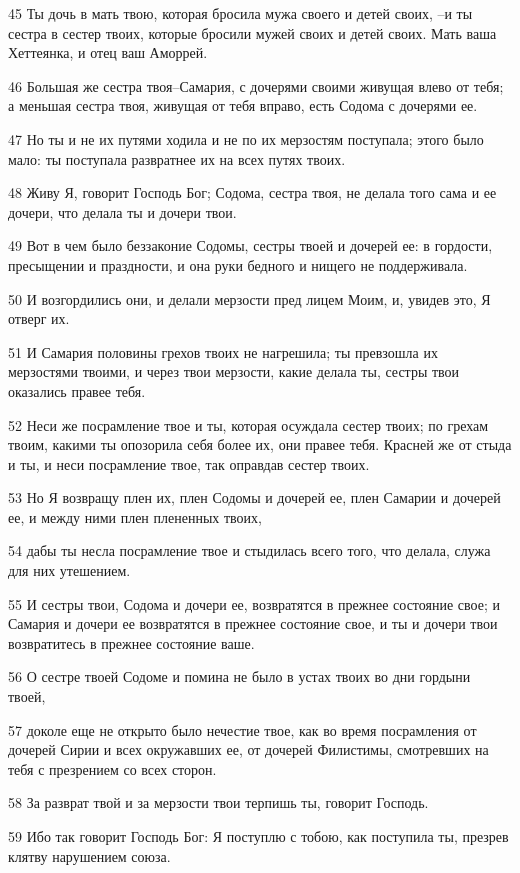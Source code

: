 \par 45 Ты дочь в мать твою, которая бросила мужа своего и детей своих, --и ты сестра в сестер твоих, которые бросили мужей своих и детей своих. Мать ваша Хеттеянка, и отец ваш Аморрей.
\par 46 Большая же сестра твоя--Самария, с дочерями своими живущая влево от тебя; а меньшая сестра твоя, живущая от тебя вправо, есть Содома с дочерями ее.
\par 47 Но ты и не их путями ходила и не по их мерзостям поступала; этого было мало: ты поступала развратнее их на всех путях твоих.
\par 48 Живу Я, говорит Господь Бог; Содома, сестра твоя, не делала того сама и ее дочери, что делала ты и дочери твои.
\par 49 Вот в чем было беззаконие Содомы, сестры твоей и дочерей ее: в гордости, пресыщении и праздности, и она руки бедного и нищего не поддерживала.
\par 50 И возгордились они, и делали мерзости пред лицем Моим, и, увидев это, Я отверг их.
\par 51 И Самария половины грехов твоих не нагрешила; ты превзошла их мерзостями твоими, и через твои мерзости, какие делала ты, сестры твои оказались правее тебя.
\par 52 Неси же посрамление твое и ты, которая осуждала сестер твоих; по грехам твоим, какими ты опозорила себя более их, они правее тебя. Красней же от стыда и ты, и неси посрамление твое, так оправдав сестер твоих.
\par 53 Но Я возвращу плен их, плен Содомы и дочерей ее, плен Самарии и дочерей ее, и между ними плен плененных твоих,
\par 54 дабы ты несла посрамление твое и стыдилась всего того, что делала, служа для них утешением.
\par 55 И сестры твои, Содома и дочери ее, возвратятся в прежнее состояние свое; и Самария и дочери ее возвратятся в прежнее состояние свое, и ты и дочери твои возвратитесь в прежнее состояние ваше.
\par 56 О сестре твоей Содоме и помина не было в устах твоих во дни гордыни твоей,
\par 57 доколе еще не открыто было нечестие твое, как во время посрамления от дочерей Сирии и всех окружавших ее, от дочерей Филистимы, смотревших на тебя с презрением со всех сторон.
\par 58 За разврат твой и за мерзости твои терпишь ты, говорит Господь.
\par 59 Ибо так говорит Господь Бог: Я поступлю с тобою, как поступила ты, презрев клятву нарушением союза.
